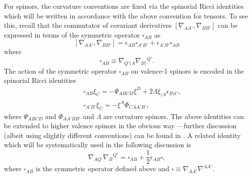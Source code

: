 \documentclass[10pt,a4paper]{article}
\theoremstyle{plain}
\begin{document}
For spinors, the curvature conventions are fixed via the spinorial
Ricci identities which will be written in accordance with the above
convention for tensors.  To see this, recall that the commutator of
covariant derivatives $[ \nabla_{AA'},\nabla_{BB'}]$ can be expressed
in terms of the symmetric operator $\square_{AB}$ as
\[
[ \nabla_{AA'},\nabla_{BB'}]= \epsilon_{AB}\square_{A'B'} +
\epsilon_{A'B'}\square_{AB}
\]
where
\[
\square_{AB} \equiv \nabla_{Q'(A} \nabla_{B)}{}^{Q'}.
\]
 The action of the symmetric operator $\square_{AB}$ on valence-1
 spinors is encoded in the spinorial Ricci identities
\begin{subequations}
\begin{eqnarray}
&& \square_{AB}\xi_{C}=-\Psi_{ABCD} \xi^{D} +
  2\Lambda\xi_{(A}\epsilon_{B)C},
 \label{SpinorialRicciIdentities1} \\
&& \square_{A'B'}\xi_{C}=-\xi^{A}\Phi_{CA A' B'},
\label{SpinorialRicciIdentities2}
\end{eqnarray}
\end{subequations}
where $\Psi_{ABCD}$ and $\Phi_{AA'BB'}$ and $\Lambda$ are curvature spinors.
 The above identities can be extended to higher valence spinors in the obvious way ---further discussion (albeit using slightly different conventions) can be found in \cite{Ste91}. A related identity which will be systematically used in the
 following discussion is
\begin{equation}\label{DecomposeDoubleDerivativeContracted}
\nabla_{AQ'}\nabla_{B}{}^{Q'}=\square_{AB}+
\frac{1}{2}\epsilon_{AB}\square,
\end{equation}
where $\square_{AB}$ is the symmetric operator defined above and
$\square \equiv \nabla_{AA'}\nabla^{AA'}.$


\end{document}
